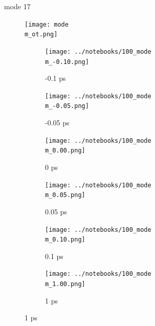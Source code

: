 \documentclass{beamer}
\begin{document}
\renewcommand\m{17}
\begin{frame}{mode \m}
				\vspace{\vh mm}
	\begin{figure}
		\centering
		\texttt{[image: mode\\m\_ot.png]}
	\end{figure}
	\begin{figure}
		\centering
		\begin{subfigure}[b]{\w\textwidth}
			\centering
			\texttt{[image: ../notebooks/100\_mode\\m\_-0.10.png]}
			\caption{-0.1 ps}
		\end{subfigure}
		\begin{subfigure}[b]{\w\textwidth}
			\centering
			\texttt{[image: ../notebooks/100\_mode\\m\_-0.05.png]}
			\caption{-0.05 ps}
		\end{subfigure}
		\begin{subfigure}[b]{\w\textwidth}
			\centering
			\texttt{[image: ../notebooks/100\_mode\\m\_0.00.png]}
			\caption{0 ps}
		\end{subfigure}
		\begin{subfigure}[b]{\w\textwidth}
			\centering
			\texttt{[image: ../notebooks/100\_mode\\m\_0.05.png]}
			\caption{0.05 ps}
		\end{subfigure}
		\begin{subfigure}[b]{\w\textwidth}
			\centering
			\texttt{[image: ../notebooks/100\_mode\\m\_0.10.png]}
			\caption{0.1 ps}
		\end{subfigure}
		\begin{subfigure}[b]{\w\textwidth}
			\centering
			\texttt{[image: ../notebooks/100\_mode\\m\_1.00.png]}
			\caption{1 ps}
		\end{subfigure}
	\end{figure}
\end{frame}
\end{document}
